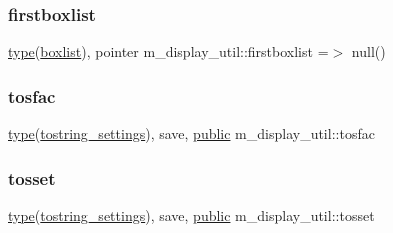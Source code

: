 \mbox{\label{namespacem__display__util_af285f44a47c745fc4da9df4a73269ac2}} 
\subsubsection{\texorpdfstring{firstboxlist}{firstboxlist}}
{\footnotesize\ttfamily \hyperlink{stop__watch_83_8txt_a70f0ead91c32e25323c03265aa302c1c}{type}(\hyperlink{structm__display__util_1_1boxlist}{boxlist}), pointer m\+\_\+display\+\_\+util\+::firstboxlist =$>$ null()\hspace{0.3cm}{\ttfamily [private]}}

\mbox{\label{namespacem__display__util_a0bd80d23e6e5fec3979a3357f65fb5e3}} 
\subsubsection{\texorpdfstring{tosfac}{tosfac}}
{\footnotesize\ttfamily \hyperlink{stop__watch_83_8txt_a70f0ead91c32e25323c03265aa302c1c}{type}(\hyperlink{structm__display__util_1_1tostring__settings}{tostring\+\_\+settings}), save, \hyperlink{M__stopwatch_83_8txt_a2f74811300c361e53b430611a7d1769f}{public} m\+\_\+display\+\_\+util\+::tosfac}

\mbox{\label{namespacem__display__util_a5c904147cafd4110a901207d859bdf7b}} 
\subsubsection{\texorpdfstring{tosset}{tosset}}
{\footnotesize\ttfamily \hyperlink{stop__watch_83_8txt_a70f0ead91c32e25323c03265aa302c1c}{type}(\hyperlink{structm__display__util_1_1tostring__settings}{tostring\+\_\+settings}), save, \hyperlink{M__stopwatch_83_8txt_a2f74811300c361e53b430611a7d1769f}{public} m\+\_\+display\+\_\+util\+::tosset}


